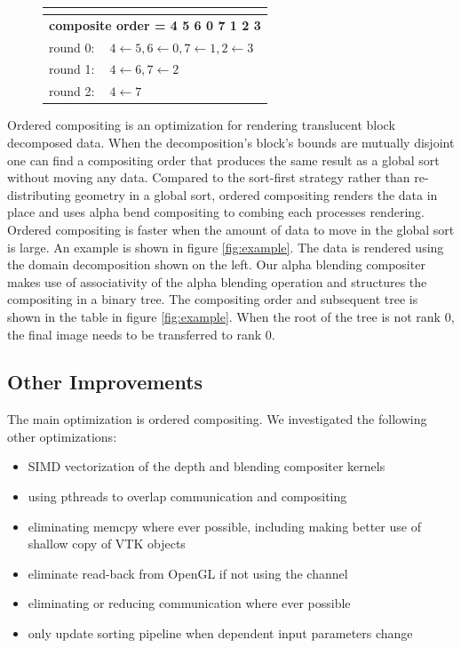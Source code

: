 \documentclass[a4paper,10pt]{report}
\begin{document}
\begin{figure}
\begin{minipage}{0.3\textwidth}
{\footnotesize
\def\arraystretch{1.25}
\begin{tabular}{|ll|}
\multicolumn{2}{c}{} \\ \hline
\multicolumn{2}{|c|}{\bf composite order = 4 5 6 0 7 1 2 3} \\ \hline
round 0: & $4 \leftarrow 5, 6 \leftarrow 0, 7 \leftarrow 1, 2 \leftarrow 3$  \\
round 1: & $4 \leftarrow 6, 7 \leftarrow 2$  \\
round 2: & $4 \leftarrow 7$ \\ \hline
\end{tabular}}
\end{minipage}
\end{figure}

Ordered compositing is an optimization for rendering translucent block decomposed data. When the decomposition's block's bounds are mutually disjoint one can find a compositing order that produces the same result as a global sort without moving any data. Compared to the sort-first strategy rather than re-distributing geometry in a global sort, ordered compositing renders the data in place and uses alpha bend compositing to combing each processes rendering. Ordered compositing is faster when the amount of data to move in the global sort is large. An example is shown in figure \ref{fig:example}. The data is rendered using the domain decomposition shown on the left. Our alpha blending compositer makes use of associativity of the alpha blending operation and structures the compositing in a binary tree. The compositing order and subsequent tree is shown in the table in figure \ref{fig:example}. When the root of the tree is not rank 0, the final image needs to be transferred to rank 0.

\subsection*{Other Improvements}
The main optimization is ordered compositing. We investigated the following other optimizations:
\begin{itemize}
 \item SIMD vectorization of the depth and blending compositer kernels
 \item using pthreads to overlap communication and compositing
 \item eliminating memcpy where ever possible, including making better use of shallow copy of VTK objects
 \item eliminate read-back from OpenGL if not using the channel
 \item eliminating or reducing communication where ever possible
 \item only update sorting pipeline when dependent input parameters change
\end{itemize}
\end{document}
